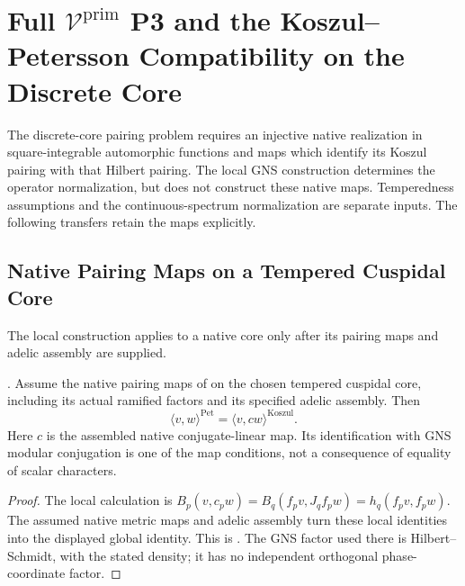 \chapter{Full \(\mathcal{V}^{\mathrm{prim}}\) P3 and the Koszul--Petersson Compatibility on the Discrete Core}
\label{v4-arith:w5-c:full-vprim-P3}

The discrete-core pairing problem requires an injective native
realization in square-integrable automorphic functions and maps
which identify its Koszul pairing with that Hilbert pairing.
The local GNS construction determines the operator normalization,
but does not construct these native maps. Temperedness assumptions
and the continuous-spectrum normalization are separate inputs.
The following transfers retain the maps explicitly.

\section{Native Pairing Maps on a Tempered Cuspidal Core}
\label{v4-arith:w5-c:recap-tempered}

The local construction applies to a native core only after its
pairing maps and adelic assembly are supplied.

\begin{theorem}
\label{v4-arith:w5-c:thm:tempered-recap}
\ClaimStatusProvedHereConditional. Assume the native pairing
maps of  on the
chosen tempered cuspidal core, including its actual ramified
factors and its specified adelic assembly. Then
\begin{equation}
 \langle v,w\rangle^{\mathrm{Pet}}
     =\langle v,cw\rangle^{\mathrm{Koszul}}.
 \label{v4-arith:w5-c:eq:tempered-recap}
\end{equation}
Here $c$ is the assembled native conjugate-linear map. Its
identification with GNS modular conjugation is one of the map
conditions, not a consequence of equality of scalar characters.
\end{theorem}
\begin{proof}
The local calculation is
$B_p(v,c_pw)=B_q(f_pv,J_qf_pw)=h_q(f_pv,f_pw)$.
The assumed native metric maps and adelic assembly turn these
local identities into the displayed global identity. This is
.
The GNS factor used there is Hilbert--Schmidt, with the stated
density; it has no independent orthogonal phase-coordinate factor.
\end{proof}

